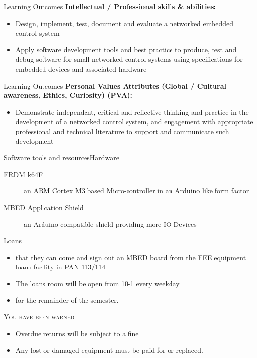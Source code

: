 \documentclass[xcolor=svgnames]{beamer}
\begin{document}
\begin{frame}{Learning Outcomes}
\textbf{Intellectual / Professional skills \& abilities:}
\begin{itemize}
    \item Design, implement, test, document and
    evaluate a networked embedded control
    system
    \item Apply software development tools and
    best practice to produce, test and
    debug software for small networked
    control systems using specifications for
    embedded devices and associated
    hardware
\end{itemize}

\end{frame}

\begin{frame}{Learning Outcomes}
\textbf{Personal Values Attributes (Global / Cultural
awareness, Ethics, Curiosity) (PVA):}
\begin{itemize}
    \item Demonstrate independent, critical and
    reflective thinking and practice in the
    development of a networked control
    system, and engagement with appropriate professional and technical
    literature to support and communicate
    such development
\end{itemize}
\end{frame}

\begin{frame}{Software tools and resources}{Hardware}
  \begin{description}
    \item[FRDM k64F] an ARM Cortex M3 based Micro-controller in an Arduino like form factor
    \item[MBED Application Shield] an Arduino compatible shield providing more IO Devices
  \end{description}
\begin{alertblock}{Loans}
  \begin{itemize}
  \item that they can come and sign out an MBED board from the
        FEE equipment loans facility in PAN 113/114
  \item The loans room will be open from 10-1 every weekday
  \item for the remainder of the semester.
\end{itemize}
\begin{block}{\textsc{You have been warned}}
\begin{itemize}
  \item Overdue returns will be subject to a fine
  \item Any lost or damaged equipment must be paid for or replaced.
\end{itemize}
\end{block}
\end{alertblock}

\end{frame}
\end{document}
